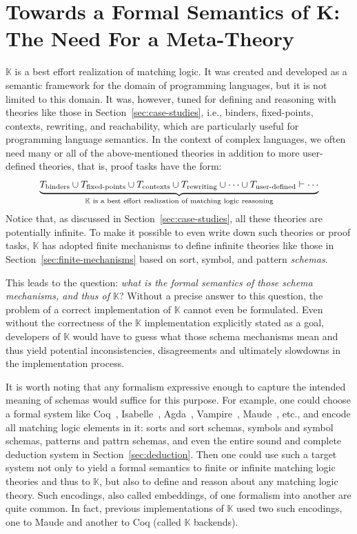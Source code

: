\documentclass[UTF8,11pt]{article}
\theoremstyle{plain}
\theoremstyle{definition}
\theoremstyle{remark}
\newcommand{\K}{\mbox{$\mathbb{K}$}\xspace}
\begin{document}
\section{Towards a Formal Semantics of K: The Need For a Meta-Theory}
\label{sec:meta-theory-reflection}

{\K} is a best effort realization of matching logic.
It was created and developed as a semantic framework for the domain
of programming languages, but it is not limited to this domain.
It was, however, tuned for defining and reasoning with theories like
those in Section~\ref{sec:case-studies}, i.e.,
binders, fixed-points, contexts, rewriting, and reachability, which
are particularly useful for programming language semantics.
In the context of complex languages, we often need many or all of the
above-mentioned theories in addition to more user-defined theories, that is,
proof tasks have the form:
$$
\underbrace{T_\textrm{binders} \cup
T_\textrm{fixed-points} \cup
T_\textrm{contexts} \cup
T_\textrm{rewriting} \cup
\cdots \cup
T_\textrm{user-defined} \vdash \cdots}_
\text{\K is a best effort realization of matching logic reasoning}
$$
Notice that, as discussed in Section~\ref{sec:case-studies}, all these
theories are potentially infinite.
To make it possible to even write down such theories or proof tasks,
\K has adopted finite mechanisms to define infinite theories like those in
Section~\ref{sec:finite-mechanisms} based on sort, symbol, and
pattern \emph{schemas}.

This leads to the question:
\emph{what is the formal semantics of those schema mechanisms, and thus
of \K}?
Without a precise answer to this question, the problem of a correct
implementation of \K cannot even be formulated.
Even without the correctness of the \K implementation explicitly stated as a goal,
developers of \K would have to guess what those schema mechanisms mean and
thus yield potential inconsistencies, disagreements and ultimately slowdowns
in the implementation process.

It is worth noting that any formalism expressive enough to capture the intended
meaning of schemas would suffice for this purpose.
For example, one could choose a formal system like Coq~\cite{coq},
Isabelle~\cite{isabelle}, Agda~\cite{agda}, Vampire~\cite{vampire},
Maude~\cite{clavel-et-al99a}, etc., and encode all matching logic elements in
it:
sorts and sort schemas, symbols and symbol schemas, patterns and
pattrn schemas, and even the entire sound and complete deduction system in
Section~\ref{sec:deduction}.
Then one could use such a target system not only to yield a formal semantics
to finite or infinite matching logic theories and thus to \K, but also to
define and reason about any matching logic theory.
Such encodings, also called embeddings, of one formalism into another are
quite common.
In fact, previous implementations of \K used two such encodings, one to
Maude and another to Coq (called \K backends).
\end{document}
